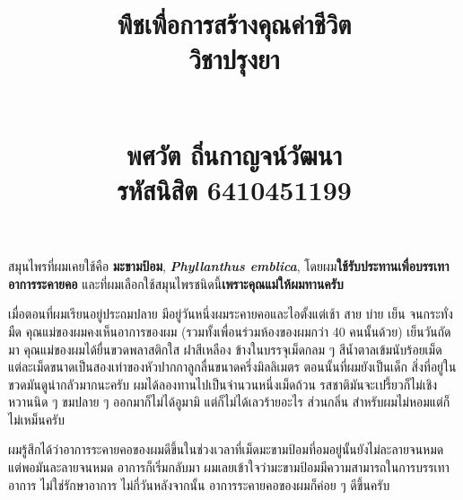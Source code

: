 \documentclass{article}
\title{\flushleft\Large พืชเพื่อการสร้างคุณค่าชีวิต\\
\Huge\textbf{วิชาปรุงยา}\\
\rule{0em}{1ex}\\
\normalsize พศวัต ถิ่นกาญจน์วัฒนา\\
รหัสนิสิต 6410451199
\vspace{-8ex}}
\author{}
\date{}
\begin{document}
\maketitle
\sloppy\flushleft

สมุนไพรที่ผมเคยใช้คือ \textbf{มะขามป้อม}, \textbf{\textit{Phyllanthus emblica}}, โดยผม\textbf{ใช้รับประทานเพื่อบรรเทาอาการระคายคอ} และที่ผมเลือกใช้สมุนไพรชนิดนี้\textbf{เพราะคุณแม่ให้ผมทานครับ}

\rule{0em}{1ex}

เมื่อตอนที่ผมเรียนอยู่ประถมปลาย มีอยู่วันหนึ่งผมระคายคอและไอตั้งแต่เช้า สาย บ่าย เย็น จนกระทั่งมืด คุณแม่ของผมคงเห็นอาการของผม (รวมทั้งเพื่อนร่วมห้องของผมกว่า 40 คนนั้นด้วย)
เย็นวันถัดมา คุณแม่ของผมได้ยื่นขวดพลาสติกใส ฝาสีเหลือง ข้างในบรรจุเม็ดกลม ๆ สีน้ำตาลเข้มนับร้อยเม็ด แต่ละเม็ดขนาดเป็นสองเท่าของหัวปากกาลูกลื่นขนาดครึ่งมิลลิเมตร
ตอนนั้นที่ผมยังเป็นเด็ก สิ่งที่อยู่ในขวดมันดูน่ากลัวมากนะครับ ผมได้ลองทานไปเป็นจำนวนหนึ่งเม็ดถ้วน รสชาติมันจะเปรี้ยวก็ไม่เชิง หวานนิด ๆ ขมปลาย ๆ ออกมาก็ไม่ได้อูมามิ แต่ก็ไม่ได้เลวร้ายอะไร
ส่วนกลิ่น สำหรับผมไม่หอมแต่ก็ไม่เหม็นครับ

\rule{0em}{1ex}

ผมรู้สึกได้ว่าอาการระคายคอของผมดีขึ้นในช่วงเวลาที่เม็ดมะขามป้อมที่อมอยู่นั้นยังไม่ละลายจนหมด แต่พอมันละลายจนหมด อาการก็เริ่มกลับมา ผมเลยเข้าใจว่ามะขามป้อมมีความสามารถในการบรรเทาอาการ
ไม่ใช่รักษาอาการ ไม่กี่วันหลังจากนั้น อาการระคายคอของผมก็ค่อย ๆ ดีขึ้นครับ
\end{document}
